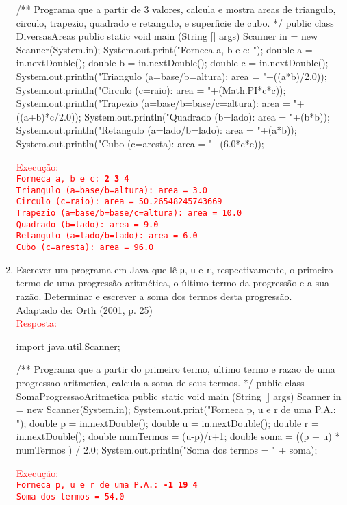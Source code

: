 \documentclass[onecolumn,a4paper,10pt]{report}
\newcommand{\+}{\, + \,}
\newcommand{\<}{\hspace*{-0.4cm}}
\begin{document}
\begin{enumerate}[1.]
\begin{javacode}
/**
   Programa que a partir de 3 valores, calcula e mostra areas de
   triangulo, circulo, trapezio, quadrado e retangulo, e
   superficie de cubo.
*/
public class DiversasAreas {
    public static void main (String [] args) {
        Scanner in = new Scanner(System.in);
        System.out.print("Forneca a, b e c: ");
        double a = in.nextDouble();
        double b = in.nextDouble();
        double c = in.nextDouble();
        System.out.println("Triangulo (a=base/b=altura): area = "+((a*b)/2.0));
        System.out.println("Circulo (c=raio): area = "+(Math.PI*c*c));
        System.out.println("Trapezio (a=base/b=base/c=altura): area = "+((a+b)*c/2.0));
        System.out.println("Quadrado (b=lado): area = "+(b*b));
        System.out.println("Retangulo (a=lado/b=lado): area = "+(a*b));
        System.out.println("Cubo (c=aresta): area = "+(6.0*c*c));
    }
}
\end{javacode}
\textcolor{red}{Execução:\\
\texttt{Forneca a, b e c: \textbf{2 3 4}\\
Triangulo (a=base/b=altura): area = 3.0\\
Circulo (c=raio): area = 50.26548245743669\\
Trapezio (a=base/b=base/c=altura): area = 10.0\\
Quadrado (b=lado): area = 9.0\\
Retangulo (a=lado/b=lado): area = 6.0\\
Cubo (c=aresta): area = 96.0}
}

\item Escrever um programa em Java que lê \texttt{p}, \texttt{u} e \texttt{r}, respectivamente, o primeiro termo de uma progressão aritmética, o último termo da progressão e a sua razão. Determinar e escrever a soma dos termos desta progressão.\\
{\tiny Adaptado de: Orth (2001, p. 25)}\\
\textcolor{red}{Resposta:}\\
\begin{javacode}
import java.util.Scanner;

/**
   Programa que a partir do primeiro termo, ultimo termo e razao de uma
   progressao aritmetica, calcula a soma de seus termos.
*/
public class SomaProgressaoAritmetica {
    public static void main (String [] args) {
        Scanner in = new Scanner(System.in);
        System.out.print("Forneca p, u e r de uma P.A.: ");
        double p = in.nextDouble();
        double u = in.nextDouble();
        double r = in.nextDouble();
        double numTermos = (u-p)/r+1;
        double soma = ((p + u) * numTermos ) / 2.0;
        System.out.println("Soma dos termos = " + soma);
    }
}
\end{javacode}
\textcolor{red}{Execução:\\
\texttt{Forneca p, u e r de uma P.A.: \textbf{-1 19 4}\\
Soma dos termos = 54.0}
}


\end{enumerate}
\end{document}
